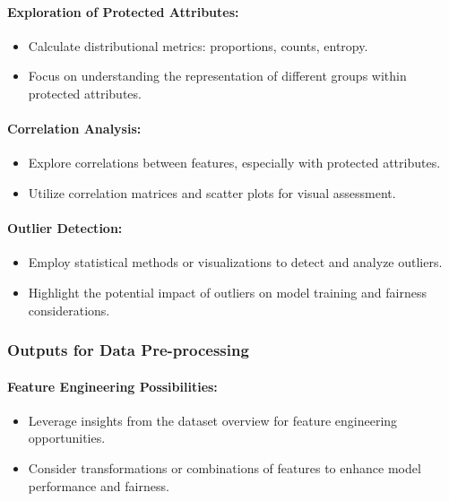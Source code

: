 \paragraph{Exploration of Protected Attributes:}
\begin{itemize}
    \item Calculate distributional metrics: proportions, counts, entropy.
    \item Focus on understanding the representation of different groups within protected attributes.
\end{itemize}

\paragraph{Correlation Analysis:}
\begin{itemize}
    \item Explore correlations between features, especially with protected attributes.
    \item Utilize correlation matrices and scatter plots for visual assessment.
\end{itemize}

\paragraph{Outlier Detection:}
\begin{itemize}
    \item Employ statistical methods or visualizations to detect and analyze outliers.
    \item Highlight the potential impact of outliers on model training and fairness considerations.
\end{itemize}

\subsubsection{Outputs for Data Pre-processing}

\paragraph{Feature Engineering Possibilities:}
\begin{itemize}
    \item Leverage insights from the dataset overview for feature engineering opportunities.
    \item Consider transformations or combinations of features to enhance model performance and fairness.
\end{itemize}

